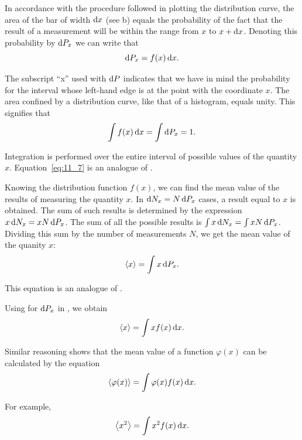 In accordance with the procedure followed in plotting the distribution curve, the area of the bar of width $\mathrm{d} x$ (see b) equals the probability of the fact that the result of a measurement will be within the range from $x$ to $x+\mathrm{d} x$. Denoting this probability by $\mathrm{d} P_x$ we can write that
\begin{equation}\label{eq:11_6}
	\mathrm{d} P_x = f(x)\,\mathrm{d} x.
\end{equation}

\noindent
The subscript ``x'' used with $\mathrm{d} P$ indicates that we have in mind the probability for the interval whose left-hand edge is at the point with the coordinate $x$. The area confined by a distribution curve, like that of a histogram, equals unity. This signifies that
\begin{equation}\label{eq:11_7}
	\int f(x)\,\mathrm{d} x = \int \mathrm{d} P_x = 1.
\end{equation}

\noindent
Integration is performed over the entire interval of possible values of the quantity $x$. Equation~\eqref{eq:11_7} is an analogue of .

Knowing the distribution function $f(x)$, we can find the mean value of the results of measuring the quantity $x$. In $\mathrm{d} N_x=N\,\mathrm{d} P_x$ cases, a result equal to $x$ is obtained. The sum of such results is determined by the expression $x\,\mathrm{d} N_x=xN\,\mathrm{d} P_x$. The sum of all the possible results is $\int x\,\mathrm{d} N_x=\int xN\,\mathrm{d} P_x$. Dividing this sum by the number of measurements $N$, we get the mean value of the quanity $x$:
\begin{equation}\label{eq:11_8}
	\left\langle x \right\rangle = \int x\,\mathrm{d} P_x.
\end{equation}

\noindent
This equation is an analogue of .

Using  for $\mathrm{d} P_x$ in , we obtain
\begin{equation}\label{eq:11_9}
	\left\langle x \right\rangle = \int x f(x)\,\mathrm{d} x.
\end{equation}

Similar reasoning shows that the mean value of a function $\varphi(x)$ can be calculated by the equation
\begin{equation}\label{eq:11_10}
	\left\langle \varphi(x) \right\rangle = \int \varphi(x) f(x)\,\mathrm{d} x.
\end{equation}

\noindent
For example,
\begin{equation}\label{eq:11_11}
	\left\langle x^2 \right\rangle = \int x^2 f(x)\,\mathrm{d} x.
\end{equation}

